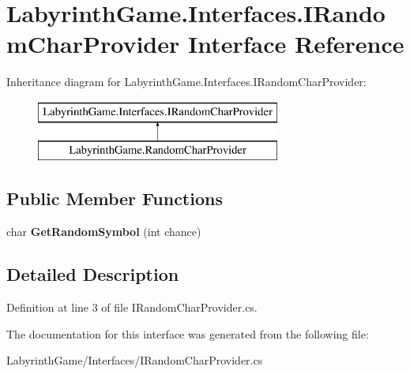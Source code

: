 \hypertarget{interface_labyrinth_game_1_1_interfaces_1_1_i_random_char_provider}{\section{Labyrinth\+Game.\+Interfaces.\+I\+Random\+Char\+Provider Interface Reference}
\label{interface_labyrinth_game_1_1_interfaces_1_1_i_random_char_provider}
}
Inheritance diagram for Labyrinth\+Game.\+Interfaces.\+I\+Random\+Char\+Provider\+:\begin{figure}[H]
\begin{center}
\leavevmode
\includegraphics[height=2.000000cm]{interface_labyrinth_game_1_1_interfaces_1_1_i_random_char_provider}
\end{center}
\end{figure}
\subsection*{Public Member Functions}
\begin{DoxyCompactItemize}
\item 
\hypertarget{interface_labyrinth_game_1_1_interfaces_1_1_i_random_char_provider_a05c954dd2de0fd0fc1c7ad10c8d82529}{char {\bfseries Get\+Random\+Symbol} (int chance)}\label{interface_labyrinth_game_1_1_interfaces_1_1_i_random_char_provider_a05c954dd2de0fd0fc1c7ad10c8d82529}

\end{DoxyCompactItemize}


\subsection{Detailed Description}


Definition at line 3 of file I\+Random\+Char\+Provider.\+cs.



The documentation for this interface was generated from the following file\+:\begin{DoxyCompactItemize}
\item 
Labyrinth\+Game/\+Interfaces/I\+Random\+Char\+Provider.\+cs\end{DoxyCompactItemize}
